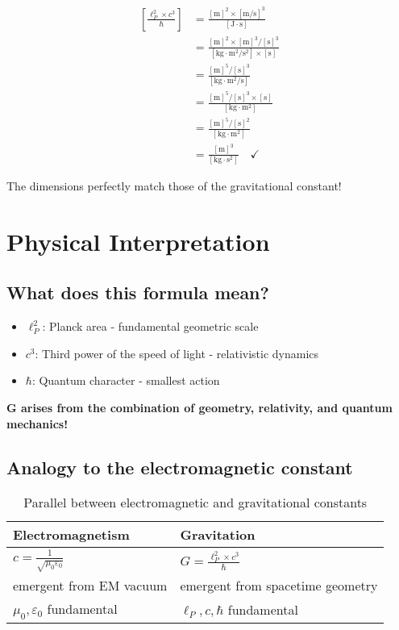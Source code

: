 \documentclass[12pt,a4paper]{article}
\theoremstyle{definition}
\begin{document}
	\begin{align}
		\left[\frac{\ell_P^2 \times c^3}{\hbar}\right] &= \frac{[\text{m}]^2 \times [\text{m}/\text{s}]^3}{[\text{J} \cdot \text{s}]} \\
		&= \frac{[\text{m}]^2 \times [\text{m}]^3/[\text{s}]^3}{[\text{kg} \cdot \text{m}^2/\text{s}^2] \times [\text{s}]} \\
		&= \frac{[\text{m}]^5/[\text{s}]^3}{[\text{kg} \cdot \text{m}^2/\text{s}]} \\
		&= \frac{[\text{m}]^5/[\text{s}]^3 \times [\text{s}]}{[\text{kg} \cdot \text{m}^2]} \\
		&= \frac{[\text{m}]^5/[\text{s}]^2}{[\text{kg} \cdot \text{m}^2]} \\
		&= \frac{[\text{m}]^3}{[\text{kg} \cdot \text{s}^2]} \quad \checkmark
	\end{align}
	
	The dimensions perfectly match those of the gravitational constant!
	
	\section{Physical Interpretation}
	
	\subsection{What does this formula mean?}
	
	\begin{itemize}
		\item \textbf{$\ell_P^2$}: Planck area - fundamental geometric scale
		\item \textbf{$c^3$}: Third power of the speed of light - relativistic dynamics
		\item \textbf{$\hbar$}: Quantum character - smallest action
	\end{itemize}
	
	\textbf{G arises from the combination of geometry, relativity, and quantum mechanics!}
	
	\subsection{Analogy to the electromagnetic constant}
	
	\begin{table}[h]
		\centering
		\begin{tabular}{ll}
			\toprule
			\textbf{Electromagnetism} & \textbf{Gravitation} \\
			\midrule
			$c = \frac{1}{\sqrt{\mu_0\varepsilon_0}}$ & $G = \frac{\ell_P^2 \times c^3}{\hbar}$ \\
			emergent from EM vacuum & emergent from spacetime geometry \\
			$\mu_0, \varepsilon_0$ fundamental & $\ell_P, c, \hbar$ fundamental \\
			\bottomrule
		\end{tabular}
		\caption{Parallel between electromagnetic and gravitational constants}
	\end{table}
	
\end{document}

